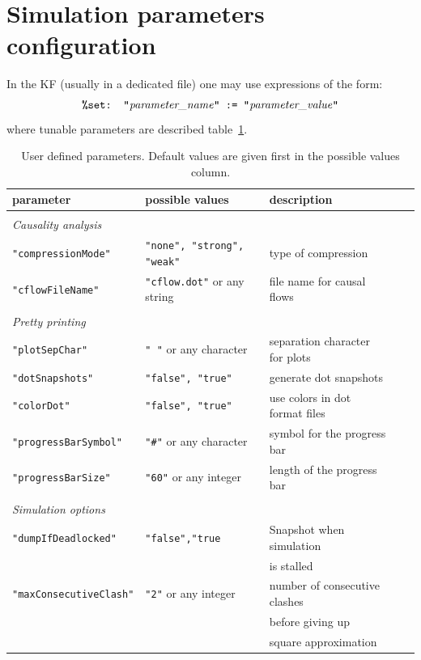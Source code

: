 \documentclass[11pt]{book}
\def\ttt#1{\texttt{#1}}
\begin{document}
\section{Simulation parameters configuration}\label{sec:param}
In the KF (usually in a dedicated file) one may use expressions of the form:
\[
\hbox{\ttt{\%set: "}\textit{parameter\_name}\ttt{" := "}\textit{parameter\_value}\ttt{"}}
\]
where tunable parameters are described table~\ref{tab:parameters}.
\begin{table}[ht]
\begin{tabular}{l|l|lll}
parameter & possible values & description \\
\hline &\\
\textit{Causality analysis}&\\
\ttt{"compressionMode"} & \ttt{"none", "strong", "weak"} & \small type of compression \\
\ttt{"cflowFileName"} & \ttt{"cflow.dot"} or any string & \small file name for causal flows\\ & \\
\textit{Pretty printing}&\\
\ttt{"plotSepChar"} & \ttt{" "} or any character & \small separation character for plots\\
\ttt{"dotSnapshots"} & \ttt{"false", "true"} & \small generate dot snapshots\\
\ttt{"colorDot"} &  \ttt{"false", "true"} & \small use colors in dot format files\\
\ttt{"progressBarSymbol"} & \ttt{"\#"} or any character & \small symbol for the progress bar\\
\ttt{"progressBarSize"} & \ttt{"60"} or any integer & \small length of the progress bar\\ &&\\
\textit{Simulation options} &\\
\ttt{"dumpIfDeadlocked"} & \ttt{"false","true} & \small Snapshot when simulation \\&&\small is stalled\\
\ttt{"maxConsecutiveClash"} & \ttt{"2"} or any integer & \small number of consecutive clashes \\ && \small before giving up \\ && \small square approximation\\

\end{tabular}\caption{User defined parameters. Default values are given first in the possible values column.}\label{tab:parameters}
\end{table}


 

\printindex
\end{document}
